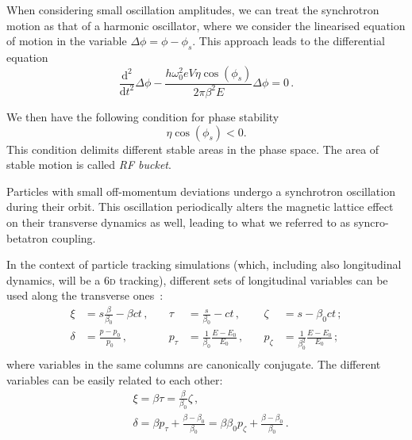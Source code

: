 When considering small oscillation amplitudes, we can treat the synchrotron motion as that of a harmonic oscillator, where we consider the linearised equation of motion in the variable $\Delta \phi=\phi-\phi_s$. This approach leads to the differential equation
\begin{equation}
    \frac{\mathrm{d}^2}{\mathrm{d} t^2} \Delta \phi-\frac{h \omega_0^2 e V \eta \cos \left(\phi_s\right)}{2 \pi \beta^2 E} \Delta \phi=0 \,.
\end{equation}

We then have the following condition for phase stability
\begin{equation}
    \eta \cos \left(\phi_s\right)<0 .
\end{equation}
This condition delimits different stable areas in the phase space. The area of stable motion is called \textit{RF bucket}. %

Particles with small off-momentum deviations undergo a synchrotron oscillation during their orbit. This oscillation periodically alters the magnetic lattice effect on their transverse dynamics as well, leading to what we referred to as syncro-betatron coupling.

In the context of particle tracking simulations (which, including also longitudinal dynamics, will be a 6\textsc{d} tracking), different sets of longitudinal variables can be used along the transverse ones~\cite{xsuite:physics}:
\begin{equation}
    \begin{aligned}
    \xi &= s \frac{\beta}{\beta_0}-\beta c t \,,\quad& \tau &= \frac{s}{\beta_0}-c t \,,\quad& \zeta &= s-\beta_0 c t \,;\\
    \delta &= \frac{p-p_0}{p_0} \,,\quad& p_\tau &= \frac{1}{\beta_0} \frac{E-E_0}{E_0} \,,\quad& p_\zeta &= \frac{1}{\beta_0^2} \frac{E-E_0}{E_0}\,; \\
    \end{aligned}
\end{equation}
where variables in the same columns are canonically conjugate.
The different variables can be easily related to each other:
\begin{equation}
    \begin{aligned}
    &\xi=\beta \tau=\frac{\beta}{\beta_0} \zeta \,,\\
    &\delta=\beta p_\tau+\frac{\beta-\beta_0}{\beta_0}=\beta \beta_0 p_\zeta+\frac{\beta-\beta_0}{\beta_0} \,.
    \end{aligned}
\end{equation}

\parseparator

